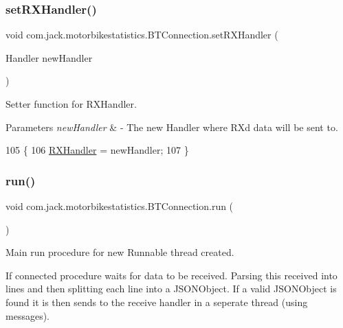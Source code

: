\subsubsection{\texorpdfstring{set\+R\+X\+Handler()}{setRXHandler()}}
{\footnotesize\ttfamily void com.\+jack.\+motorbikestatistics.\+B\+T\+Connection.\+set\+R\+X\+Handler (\begin{DoxyParamCaption}\item[{Handler}]{new\+Handler }\end{DoxyParamCaption})\hspace{0.3cm}{\ttfamily [inline]}}



Setter function for R\+X\+Handler. 


\begin{DoxyParams}{Parameters}
{\em new\+Handler} & -\/ The new Handler where RX\textquotesingle{}d data will be sent to. \\
\hline
\end{DoxyParams}

\begin{DoxyCode}
105                                                  \{
106         \hyperlink{classcom_1_1jack_1_1motorbikestatistics_1_1_b_t_connection_a64fc7b02a2b9f052c6b05842b79b3cdc}{RXHandler} = newHandler;
107     \}
\end{DoxyCode}
\mbox{\label{classcom_1_1jack_1_1motorbikestatistics_1_1_b_t_connection_ae4c6a0897742c6a7ccfb0b43d0d987da}} 
\subsubsection{\texorpdfstring{run()}{run()}}
{\footnotesize\ttfamily void com.\+jack.\+motorbikestatistics.\+B\+T\+Connection.\+run (\begin{DoxyParamCaption}{ }\end{DoxyParamCaption})\hspace{0.3cm}{\ttfamily [inline]}}



Main run procedure for new Runnable thread created. 

If connected procedure waits for data to be received. Parsing this received into lines and then splitting each line into a J\+S\+O\+N\+Object. If a valid J\+S\+O\+N\+Object is found it is then sends to the receive handler in a seperate thread (using messages). 

